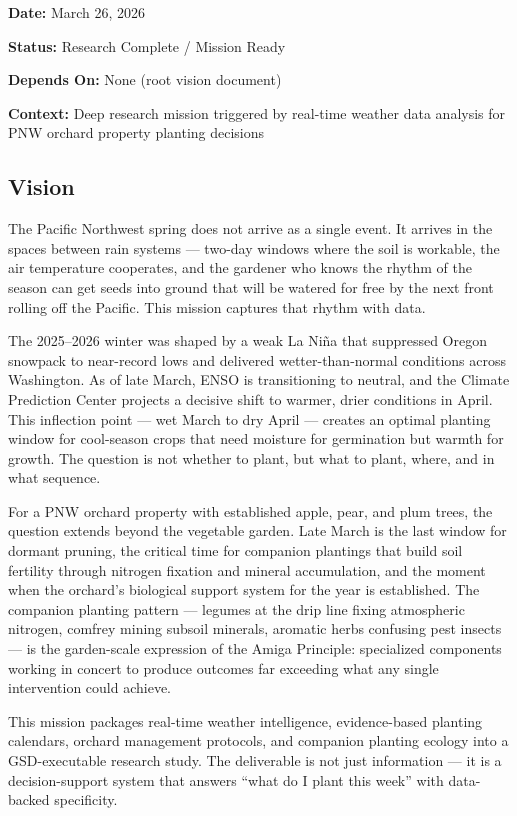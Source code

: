 \documentclass[11pt,letterpaper]{article}
\newcommand{\metafield}[2]{\textbf{\sffamily #1} #2\par}
\begin{document}
\metafield{Date:}{March 26, 2026}
\metafield{Status:}{Research Complete / Mission Ready}
\metafield{Depends On:}{None (root vision document)}
\metafield{Context:}{Deep research mission triggered by real-time weather data analysis for PNW orchard property planting decisions}

\subsection{Vision}

The Pacific Northwest spring does not arrive as a single event. It arrives in the spaces between rain systems --- two-day windows where the soil is workable, the air temperature cooperates, and the gardener who knows the rhythm of the season can get seeds into ground that will be watered for free by the next front rolling off the Pacific. This mission captures that rhythm with data.

The 2025--2026 winter was shaped by a weak La Niña that suppressed Oregon snowpack to near-record lows and delivered wetter-than-normal conditions across Washington. As of late March, ENSO is transitioning to neutral, and the Climate Prediction Center projects a decisive shift to warmer, drier conditions in April. This inflection point --- wet March to dry April --- creates an optimal planting window for cool-season crops that need moisture for germination but warmth for growth. The question is not whether to plant, but what to plant, where, and in what sequence.

For a PNW orchard property with established apple, pear, and plum trees, the question extends beyond the vegetable garden. Late March is the last window for dormant pruning, the critical time for companion plantings that build soil fertility through nitrogen fixation and mineral accumulation, and the moment when the orchard's biological support system for the year is established. The companion planting pattern --- legumes at the drip line fixing atmospheric nitrogen, comfrey mining subsoil minerals, aromatic herbs confusing pest insects --- is the garden-scale expression of the Amiga Principle: specialized components working in concert to produce outcomes far exceeding what any single intervention could achieve.

This mission packages real-time weather intelligence, evidence-based planting calendars, orchard management protocols, and companion planting ecology into a GSD-executable research study. The deliverable is not just information --- it is a decision-support system that answers ``what do I plant this week'' with data-backed specificity.
\end{document}

